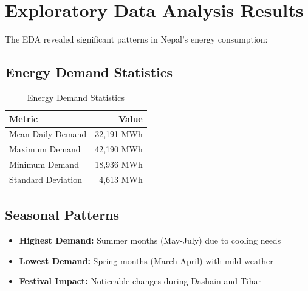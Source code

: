         \section{Exploratory Data Analysis Results}
        The EDA revealed significant patterns in Nepal's energy consumption:

        \subsection{Energy Demand Statistics}
        \begin{table}[h]
                \begin{center}
                \begin{tabular}{|l|r|}
                \hline
                \textbf{Metric} & \textbf{Value} \\
                \hline
                Mean Daily Demand & 32,191 MWh \\
                \hline
                Maximum Demand & 42,190 MWh \\
                \hline
                Minimum Demand & 18,936 MWh \\
                \hline
                Standard Deviation & 4,613 MWh \\
                \hline
                \end{tabular}
                \end{center}
                \caption{Energy Demand Statistics}
        \end{table}

        \subsection{Seasonal Patterns}
        \begin{itemize}
            \item \textbf{Highest Demand:} Summer months (May-July) due to cooling needs
            \item \textbf{Lowest Demand:} Spring months (March-April) with mild weather
            \item \textbf{Festival Impact:} Noticeable changes during Dashain and Tihar
        \end{itemize}

